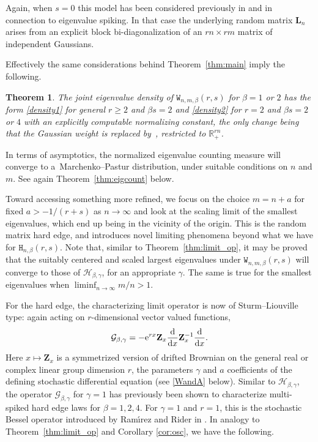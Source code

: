 \documentclass[pdftex]{sigma}
\numberwithin{equation}{section}
\newtheorem{Theorem}{Theorem}[section]
\theoremstyle{definition}
\newcommand{\R}{{\mathbb R}}
\newcommand{\mbf}[1]{\mathbf{#1}}
\begin{document}
Again, when $s=0$ this model has been considered previously in \cite{Spike2} and \cite{RR} in connection to eigenvalue spiking.
In that case the underlying random matrix $\mbf{L}_n$ arises from an explicit block bi-diagonalization of an $rn \times rm$ matrix of independent Gaussians.

Effectively the same considerations behind Theorem~\ref{thm:main} imply the following.


\begin{Theorem}\label{thm:main_W}
The joint eigenvalue density of $\mathtt{W}_{n, m, \beta}(r, s)$ for $\beta=1$ or $2$ has the form
\eqref{density1} for general $r\ge 2$ and $\beta s=2$ and \eqref{density2} for $r =2$ and $\beta s =2$ or $4$ with an explicitly computable normalizing constant,
the only change being that the Gaussian weight  is replaced by~, restricted to $\R_{+}^{rn}$.
\end{Theorem}

In terms of asymptotics, the normalized eigenvalue counting measure will converge to a~Ma\-rchenko--Pastur distribution, under suitable conditions on $n$ and $m$. See again Theorem~\ref{thm:eigcount} below.

Toward accessing something more refined,
we focus on the choice $m = n +a $ for fixed $a > -1/(r+s)$ as $n \rightarrow \infty$ and look at the scaling limit of the smallest eigenvalues, which end up being in the vicinity of the origin. This is the random matrix hard edge, and introduces novel limiting phenomena beyond what we have for $\mathtt{H}_{n, \beta}(r, s)$. Note that, similar to Theorem~\ref{thm:limit_op}, it may be proved that the suitably centered and scaled largest eigenvalues under $\mathtt{W}_{n, m, \beta}(r, s)$ will converge to those of $\mathcal{H}_{\beta, \gamma}$, for an appropriate $\gamma$. The same is true for the smallest eigenvalues when $\liminf_{n\to \infty} m/n>1$.




For the hard edge, the characterizing limit operator is now of Sturm--Liouville type:
again acting on $r$-dimensional vector valued functions,
\begin{equation}
\label{matrixgenerator}
 \mathcal{G}_{\beta, \gamma} = - {\rm e}^{rx} {\bf{Z}}_x \frac{\rm d}{{\rm d}x} {\mbf{Z}_x^{-1} } \frac{\rm d}{{\rm d}x}.
\end{equation}
Here $x \mapsto {{\mbf{Z}}_x} $ is a symmetrized version of drifted Brownian on the general real or complex linear group dimension $r$, the parameters $\gamma$ and $a$ coefficients of the defining stochastic differential equation (see \eqref{WandA} below).
Similar to $\mathcal{H}_{\beta, \gamma}$, the operator $\mathcal{G}_{\beta, \gamma}$ for $\gamma =1$
has previously been shown to characterize multi-spiked hard edge laws \cite{RR2} for
$\beta =1,2,4$. For $\gamma=1$ and $r=1$, this is the stochastic Bessel operator introduced by Ram\'{\i}rez and Rider in
\cite{RR}.
In analogy to Theorem~\ref{thm:limit_op} and Corollary \ref{cor:osc}, we have the following.
\end{document}
